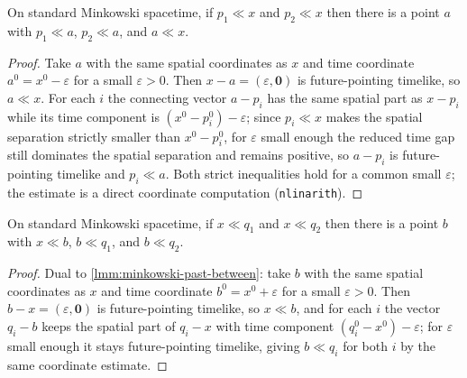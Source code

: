 \begin{lemma}
    \label{lmm:minkowski-past-between}
    \leanok
    On standard Minkowski spacetime, if $p_1 \ll x$ and $p_2 \ll x$ then there is a point $a$ with $p_1 \ll a$, $p_2 \ll a$, and $a \ll x$.
\end{lemma}
\begin{proof}
    \leanok
    Take $a$ with the same spatial coordinates as $x$ and time coordinate $a^0 = x^0 - \varepsilon$ for a small $\varepsilon > 0$. Then $x - a = (\varepsilon, \mathbf{0})$ is future-pointing timelike, so $a \ll x$. For each $i$ the connecting vector $a - p_i$ has the same spatial part as $x - p_i$ while its time component is $(x^0 - p_i^0) - \varepsilon$; since $p_i \ll x$ makes the spatial separation strictly smaller than $x^0 - p_i^0$, for $\varepsilon$ small enough the reduced time gap still dominates the spatial separation and remains positive, so $a - p_i$ is future-pointing timelike and $p_i \ll a$. Both strict inequalities hold for a common small $\varepsilon$; the estimate is a direct coordinate computation (\texttt{nlinarith}).
\end{proof}

\begin{lemma}
    \label{lmm:minkowski-future-between}
    \leanok
    On standard Minkowski spacetime, if $x \ll q_1$ and $x \ll q_2$ then there is a point $b$ with $x \ll b$, $b \ll q_1$, and $b \ll q_2$.
\end{lemma}
\begin{proof}
    \leanok
    Dual to \ref{lmm:minkowski-past-between}: take $b$ with the same spatial coordinates as $x$ and time coordinate $b^0 = x^0 + \varepsilon$ for a small $\varepsilon > 0$. Then $b - x = (\varepsilon, \mathbf{0})$ is future-pointing timelike, so $x \ll b$, and for each $i$ the vector $q_i - b$ keeps the spatial part of $q_i - x$ with time component $(q_i^0 - x^0) - \varepsilon$; for $\varepsilon$ small enough it stays future-pointing timelike, giving $b \ll q_i$ for both $i$ by the same coordinate estimate.
\end{proof}

